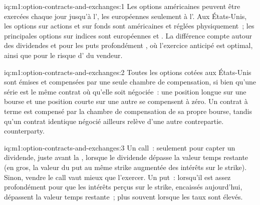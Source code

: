 \begin{solution}{iq:m1:option-contracts-and-exchanges:1}
Les options américaines peuvent être exercées chaque jour jusqu'à l', les européennes seulement à
l'. Aux États-Unis, les options sur actions et sur fonds sont américaines et réglées physiquement~;
les principales options sur indices sont européennes et . La
différence compte autour des dividendes et pour les puts profondément , où
l'exercice anticipé est optimal, ainsi que pour le risque d' du vendeur.
\end{solution}

\begin{solution}{iq:m1:option-contracts-and-exchanges:2}
Toutes les options cotées aux États-Unis sont émises et compensées par une seule chambre de compensation, si bien qu'une série
est le même contrat où qu'elle soit négociée~: une position longue sur une bourse et une position courte sur une autre se compensent à zéro. Un contrat à terme
est compensé par la chambre de compensation de sa propre bourse, tandis qu'un contrat identique négocié ailleurs relève d'une autre
contrepartie.
counterparty.
\end{solution}

\begin{solution}{iq:m1:option-contracts-and-exchanges:3}
Un call~: seulement pour capter un dividende, juste avant la , lorsque le
dividende dépasse la valeur temps restante (en gros, la valeur du put au même strike
augmentée des intérêts sur le strike). Sinon, vendre le call
vaut mieux que l'exercer. Un put~: lorsqu'il est assez profondément  pour que
les intérêts perçus sur le strike, encaissés aujourd'hui, dépassent la valeur temps restante~;
plus souvent lorsque les taux sont élevés.
\end{solution}

